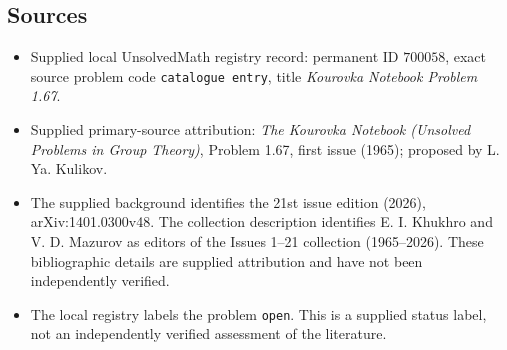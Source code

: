 \documentclass[11pt]{article}
\begin{document}
\subsection{Sources}
\begin{itemize}
\item Supplied local UnsolvedMath registry record: permanent ID \(700058\), exact source problem code \texttt{catalogue entry}, title \emph{Kourovka Notebook Problem 1.67}.
\item Supplied primary-source attribution: \emph{The Kourovka Notebook (Unsolved Problems in Group Theory)}, Problem 1.67, first issue (1965); proposed by L. Ya. Kulikov.
\item The supplied background identifies the 21st issue edition (2026), arXiv:1401.0300v48. The collection description identifies E. I. Khukhro and V. D. Mazurov as editors of the Issues 1--21 collection (1965--2026). These bibliographic details are supplied attribution and have not been independently verified.
\item The local registry labels the problem \texttt{open}. This is a supplied status label, not an independently verified assessment of the literature.
\end{itemize}
\end{document}
